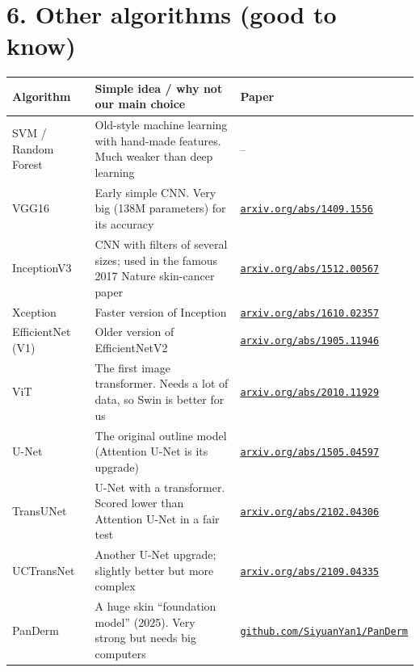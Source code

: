 \documentclass[11pt,a4paper]{article}
\begin{document}
\section*{6. Other algorithms (good to know)}
\begin{tabularx}{\linewidth}{@{}L{2.9cm} Y L{3.4cm}@{}}
\toprule
\textbf{Algorithm} & \textbf{Simple idea / why not our main choice} & \textbf{Paper} \\
\midrule
SVM / Random Forest & Old-style machine learning with hand-made features. Much weaker than deep learning & -- \\
VGG16 & Early simple CNN. Very big (138M parameters) for its accuracy & \href{https://arxiv.org/abs/1409.1556}{\nolinkurl{arxiv.org/abs/1409.1556}} \\
InceptionV3 & CNN with filters of several sizes; used in the famous 2017 Nature skin-cancer paper & \href{https://arxiv.org/abs/1512.00567}{\nolinkurl{arxiv.org/abs/1512.00567}} \\
Xception & Faster version of Inception & \href{https://arxiv.org/abs/1610.02357}{\nolinkurl{arxiv.org/abs/1610.02357}} \\
EfficientNet (V1) & Older version of EfficientNetV2 & \href{https://arxiv.org/abs/1905.11946}{\nolinkurl{arxiv.org/abs/1905.11946}} \\
ViT & The first image transformer. Needs a lot of data, so Swin is better for us & \href{https://arxiv.org/abs/2010.11929}{\nolinkurl{arxiv.org/abs/2010.11929}} \\
U-Net & The original outline model (Attention U-Net is its upgrade) & \href{https://arxiv.org/abs/1505.04597}{\nolinkurl{arxiv.org/abs/1505.04597}} \\
TransUNet & U-Net with a transformer. Scored lower than Attention U-Net in a fair test & \href{https://arxiv.org/abs/2102.04306}{\nolinkurl{arxiv.org/abs/2102.04306}} \\
UCTransNet & Another U-Net upgrade; slightly better but more complex & \href{https://arxiv.org/abs/2109.04335}{\nolinkurl{arxiv.org/abs/2109.04335}} \\
PanDerm & A huge skin ``foundation model'' (2025). Very strong but needs big computers & \href{https://github.com/SiyuanYan1/PanDerm}{\nolinkurl{github.com/SiyuanYan1/PanDerm}} \\
\bottomrule
\end{tabularx}

\end{document}
